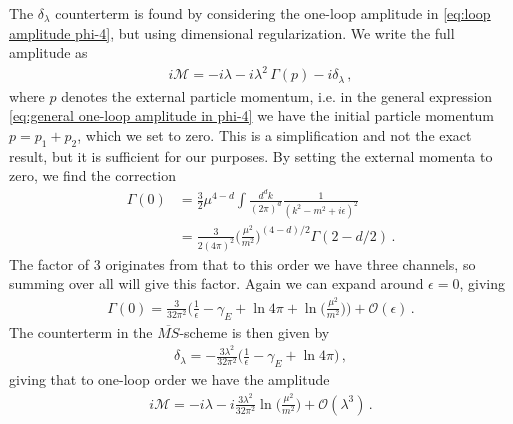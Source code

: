 The $\delta_{\lambda}$ counterterm is found by considering the one-loop amplitude in \cref{eq:loop amplitude phi-4}, but using dimensional regularization. We write the full amplitude as
\begin{align}
    i\mathcal{M}=-i\lambda-i\lambda^{2}\,\Gamma(p)-i\delta_{\lambda}\,,
\end{align}
where $p$ denotes the external particle momentum, i.e. in the general expression \cref{eq:general one-loop amplitude in phi-4} we have the initial particle momentum $p=p_1+p_2$, which we set to zero. This is a simplification and not the exact result, but it is sufficient for our purposes. By setting the external momenta to zero, we find the correction
\begin{align}
    \Gamma(0)&=\frac{3}{2}\mu^{4-d}\int\frac{d^{d}k}{(2\pi)^{d}}\frac{1}{(k^{2}-m^{2}+i\epsilon)^{2}}\nonumber
    \\
    &=\frac{3}{2(4\pi)^{2}}\Big(\frac{\mu^{2}}{m^{2}}\Big)^{(4-d)/2}\Gamma(2-d/2)\,.
\end{align}
The factor of $3$ originates from that to this order we have three channels, so summing over all will give this factor. 
Again we can expand around $\epsilon=0$, giving
\begin{align}
    \Gamma(0)=\frac{3}{32\pi^{2}}\Big(\frac{1}{\epsilon}-\gamma_{E}+\ln4\pi+\ln\Big(\frac{\mu^{2}}{m^{2}}\Big)\Big)+\mathcal{O}(\epsilon)\,.
\end{align}
The counterterm in the $\overline{MS}$-scheme is then given by
\begin{align}
    \delta_{\lambda}=-\frac{3\lambda^{2}}{32\pi^{2}}\big(\frac{1}{\epsilon}-\gamma_{E}+\ln4\pi\big)\,,
\end{align}
giving that to one-loop order we have the amplitude
\begin{align}\label{eq:one-loop amplitude phi-4}
    i\mathcal{M}=-i\lambda-i\frac{3\lambda^{2}}{32\pi^{2}}\ln\Big(\frac{\mu^{2}}{m^{2}}\Big)+\mathcal{O}(\lambda^{3})\,.
\end{align}


